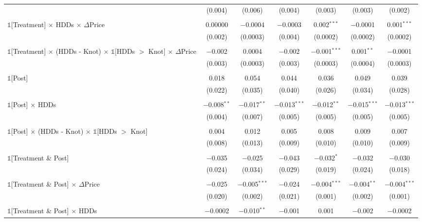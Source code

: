 \begin{table}[!htbp]
\begin{longtable}{@{\extracolsep{15pt}}lcccccc}
  & (0.004) & (0.006) & (0.004) & (0.003) & (0.003) & (0.002) \\ 
  & & & & & & \\ 
 $\mathbb{1}$[Treatment] $\times$ HDDs $\times$ $\Delta$Price & 0.00000 & $-$0.0004 & $-$0.0003 & 0.002$^{***}$ & $-$0.0001 & 0.001$^{***}$ \\ 
  & (0.002) & (0.0003) & (0.004) & (0.0002) & (0.0002) & (0.0002) \\ 
  & & & & & & \\ 
 $\mathbb{1}$[Treatment] $\times$ (HDDs - Knot) $\times$ $\mathbb{1}$[HDDs $>$ Knot] $\times$ $\Delta$Price & $-$0.002 & 0.0004 & $-$0.002 & $-$0.001$^{***}$ & 0.001$^{**}$ & $-$0.0001 \\ 
  & (0.003) & (0.0003) & (0.003) & (0.0003) & (0.0004) & (0.0003) \\ 
  & & & & & & \\ 
 $\mathbb{1}$[Post] & 0.018 & 0.054 & 0.044 & 0.036 & 0.049 & 0.039 \\ 
  & (0.022) & (0.035) & (0.040) & (0.026) & (0.034) & (0.028) \\ 
  & & & & & & \\ 
 $\mathbb{1}$[Post] $\times$ HDDs & $-$0.008$^{**}$ & $-$0.017$^{**}$ & $-$0.013$^{***}$ & $-$0.012$^{**}$ & $-$0.015$^{***}$ & $-$0.013$^{***}$ \\ 
  & (0.004) & (0.007) & (0.005) & (0.005) & (0.005) & (0.005) \\ 
  & & & & & & \\ 
 $\mathbb{1}$[Post] $\times$ (HDDs - Knot) $\times$ $\mathbb{1}$[HDDs $>$ Knot] & 0.004 & 0.012 & 0.005 & 0.008 & 0.009 & 0.007 \\ 
  & (0.008) & (0.013) & (0.009) & (0.010) & (0.010) & (0.009) \\ 
  & & & & & & \\ 
 $\mathbb{1}$[Treatment \& Post] & $-$0.035 & $-$0.025 & $-$0.043 & $-$0.032$^{*}$ & $-$0.032 & $-$0.030 \\ 
  & (0.024) & (0.034) & (0.029) & (0.019) & (0.024) & (0.018) \\ 
  & & & & & & \\ 
 $\mathbb{1}$[Treatment \& Post] $\times$ $\Delta$Price & $-$0.025 & $-$0.005$^{***}$ & $-$0.024 & $-$0.004$^{***}$ & $-$0.004$^{**}$ & $-$0.004$^{***}$ \\ 
  & (0.020) & (0.002) & (0.021) & (0.001) & (0.002) & (0.001) \\ 
  & & & & & & \\ 
 $\mathbb{1}$[Treatment \& Post] $\times$ HDDs & $-$0.0002 & $-$0.010$^{**}$ & $-$0.001 & 0.001 & $-$0.002 & $-$0.0002 \\ 

\end{longtable}
\end{table}
